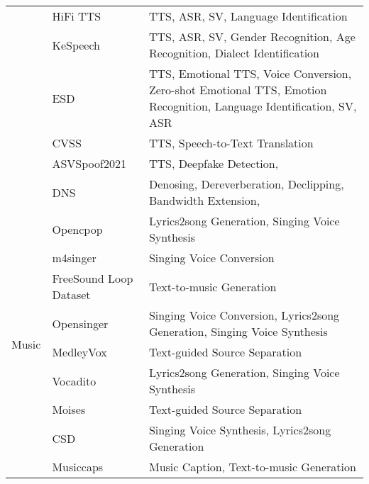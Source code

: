 \begin{longtable}{p{2cm}p{6cm}p{6cm}}
                         & HiFi TTS \cite{bakhturina2021hi}  & TTS, ASR, SV, Language Identification \\  
                         & KeSpeech \cite{tang2021kespeech}  & TTS, ASR, SV, Gender Recognition, Age Recognition, Dialect Identification \\  
                         & ESD \cite{zhou2022emotional}  & TTS, Emotional TTS, Voice Conversion, Zero-shot Emotional TTS, Emotion Recognition, Language Identification, SV, ASR \\  
                         & CVSS \cite{jia2022cvss}  & TTS, Speech-to-Text Translation \\  
                         & ASVSpoof2021 \cite{liu2023asvspoof}  & TTS, Deepfake Detection,  \\  
                         & DNS \cite{reddy2001interspeech}  & Denosing, Dereverberation, Declipping, Bandwidth Extension,   \\  
    \midrule
    \multirow{19}{*}{Music} & Opencpop \cite{wang2022opencpop}  & Lyrics2song Generation, Singing Voice Synthesis \\  %
                           & m4singer \cite{zhang2022m4singer}  & Singing Voice Conversion  \\  %
                           & FreeSound Loop Dataset \cite{ramires2020}  & Text-to-music Generation \\  %
                           & Opensinger \cite{huang2021multi}  & Singing Voice Conversion, Lyrics2song Generation, Singing Voice Synthesis  \\  %
                           & MedleyVox \cite{jeon2023medleyvox}  & Text-guided Source Separation \\  %
                           & Vocadito \cite{bittner2021vocadito}  & Lyrics2song Generation, Singing Voice Synthesis \\  %
                           & Moises \cite{pereira2023moisesdb}  & Text-guided Source Separation \\  %
                           & CSD \cite{choi2020children}  & Singing Voice Synthesis, Lyrics2song Generation \\  %
                           & Musiccaps \cite{agostinelli2023musiclm}  & Music Caption, Text-to-music Generation\\  %
                           

\end{longtable}
